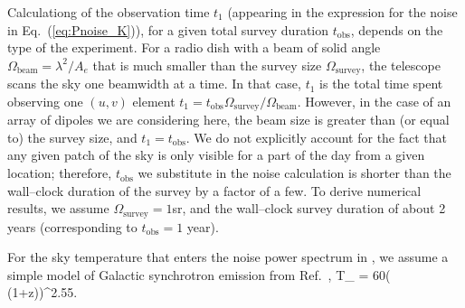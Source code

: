 Calculationg of the observation time $t_1$ (appearing in the expression for the noise in Eq.~(\ref{eq:Pnoise_K})), for a given total survey duration $t_\text{obs}$, depends on the type of the experiment.  For a radio dish with a beam of solid angle $\Omega_\text{beam}=\lambda^2/A_e$ that is much smaller than the survey size $\Omega_\text{survey}$, the telescope scans the sky one beamwidth at a time. In that case, $t_1$ is the total time spent observing one $(u,v)$ element $t_1=t_\text{obs}\Omega_\text{survey}/\Omega_\text{beam}$. However, in the case of an array of dipoles we are considering here, the beam size is greater than (or equal to) the survey size, and $t_1=t_\text{obs}$. We do not explicitly account for the fact that any given patch of the sky is only visible for a part of the day from a given location; therefore, $t_\text{obs}$ we substitute in the noise calculation is shorter than the wall--clock duration of the survey by a factor of a few. To derive numerical results, we assume $\Omega_\text{survey}=1$sr, and the wall--clock survey duration of about 2 years (corresponding to $t_\text{obs}=1$ year). 

For the sky temperature that enters the noise power spectrum in \eq{\ref{eq:Pnoise_K}}, we assume a simple model of Galactic synchrotron emission from Ref.~\cite{2008PhRvD..78b3529M}, 
\beq
T_  = 60\left( (1+z)\right)^{2.55}\text{   [K]}.
\label{eq:tsys}
\eeq

